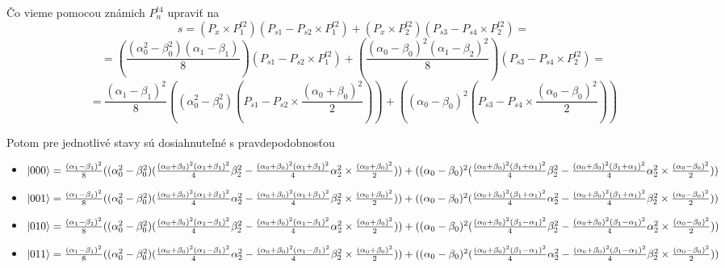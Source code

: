Čo vieme pomocou známich \(P^{t4}_n\) upraviť na 
\[s = (P_x \times P^{t2}_1)(P_{s1} - P_{s2} \times P^{t2}_1) + (P_x \times P^{t2}_2)(P_{s3} - P_{s4} \times P^{t2}_2) = \]
\[= (\frac{(\alpha^2_0 - \beta^2_0)(\alpha_1 - \beta_1)}{8})(P_{s1} - P_{s2} \times P^{t2}_1) + (\frac{(\alpha_0 - \beta_0)^2(\alpha_1 - \beta_2)^2}{8})(P_{s3} - P_{s4} \times P^{t2}_2) = \]
\[= \frac{(\alpha_1 - \beta_1)^2}{8}((\alpha^2_0 - \beta^2_0)(P_{s1} - P_{s2} \times \frac{(\alpha_0 + \beta_0)^2}{2})) + ((\alpha_0 - \beta_0)^2(P_{s3} - P_{s4} \times \frac{(\alpha_0 - \beta_0)^2}{2}))\]

Potom pre jednotlivé stavy sú dosiahnuteľné s pravdepodobnosťou
\begin{itemize}
\item[] \(\ket{000} = \frac{(\alpha_1 - \beta_1)^2}{8}((\alpha^2_0 - \beta^2_0)(\frac{(\alpha_0 + \beta_0)^2(\alpha_1 + \beta_1)^2}{4}\beta^2_2 - \frac{(\alpha_0 + \beta_0)^2(\alpha_1 + \beta_1)^2}{4}\alpha^2_2 \times \frac{(\alpha_0 + \beta_0)^2}{2})) + ((\alpha_0 - \beta_0)^2(\frac{(\alpha_0 + \beta_0)^2(\beta_1 + \alpha_1)^2}{4}\beta^2_2 - \frac{(\alpha_0 + \beta_0)^2(\beta_1 + \alpha_1)^2}{4}\alpha^2_2 \times \frac{(\alpha_0 - \beta_0)^2}{2}))\)

\item[] \(\ket{001} = \frac{(\alpha_1 - \beta_1)^2}{8}((\alpha^2_0 - \beta^2_0)(\frac{(\alpha_0 + \beta_0)^2(\alpha_1 + \beta_1)^2}{4}\alpha^2_2 - \frac{(\alpha_0 + \beta_0)^2(\alpha_1 + \beta_1)^2}{4}\beta^2_2 \times \frac{(\alpha_0 + \beta_0)^2}{2})) + ((\alpha_0 - \beta_0)^2(\frac{(\alpha_0 + \beta_0)^2(\beta_1 + \alpha_1)^2}{4}\alpha^2_2 - \frac{(\alpha_0 + \beta_0)^2(\beta_1 + \alpha_1)^2}{4}\beta^2_2 \times \frac{(\alpha_0 - \beta_0)^2}{2}))\) 

\item[] \(\ket{010} = \frac{(\alpha_1 - \beta_1)^2}{8}((\alpha^2_0 - \beta^2_0)(\frac{(\alpha_0 + \beta_0)^2(\alpha_1 - \beta_1)^2}{4}\beta^2_2 - \frac{(\alpha_0 + \beta_0)^2(\alpha_1 - \beta_1)^2}{4}\alpha^2_2 \times \frac{(\alpha_0 + \beta_0)^2}{2})) + ((\alpha_0 - \beta_0)^2(\frac{(\alpha_0 + \beta_0)^2(\beta_1 - \alpha_1)^2}{4}\beta^2_2 - \frac{(\alpha_0 + \beta_0)^2(\beta_1 - \alpha_1)^2}{4}\alpha^2_2 \times \frac{(\alpha_0 - \beta_0)^2}{2}))\)

\item[] \(\ket{011} = \frac{(\alpha_1 - \beta_1)^2}{8}((\alpha^2_0 - \beta^2_0)(\frac{(\alpha_0 + \beta_0)^2(\alpha_1 - \beta_1)^2}{4}\alpha^2_2 - \frac{(\alpha_0 + \beta_0)^2(\alpha_1 - \beta_1)^2}{4}\beta^2_2 \times \frac{(\alpha_0 + \beta_0)^2}{2})) + ((\alpha_0 - \beta_0)^2(\frac{(\alpha_0 + \beta_0)^2(\beta_1 - \alpha_1)^2}{4}\alpha^2_2 - \frac{(\alpha_0 + \beta_0)^2(\beta_1 - \alpha_1)^2}{4}\beta^2_2 \times \frac{(\alpha_0 - \beta_0)^2}{2}))\)


\end{itemize}
